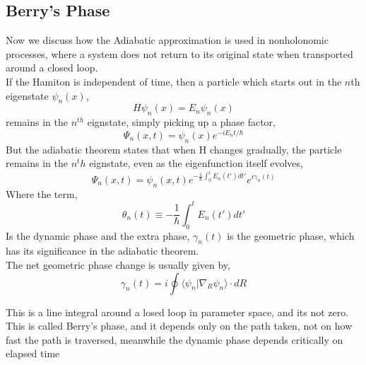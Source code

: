 \subsection{Berry's Phase}
Now we discuss how the Adiabatic approximation is used in nonholonomic processes, where a system does not return to its original state when transported around a closed loop.\\
If the Hamiton is independent of time, then a particle which starts out in the $n$th eigenstate $\psi_n(x)$,
\begin{equation}
	H\psi_n(x)=E_n\psi_n(x)
\end{equation}
remains in the $n^{th}$ eignstate, simply picking up a phase factor,
\begin{equation}
	\Psi_n(x,t)=\psi_n(x)e^{-iE_nt/\hbar}
\end{equation}
But the adiabatic theorem states that when H changes gradually, the particle remains in the $n^th$ eignstate, even as the eigenfunction itself evolves,
\begin{equation}
	\Psi_n(x,t)=\psi_n(x,t)e^{-\frac{1}{\hbar}\int_{0}^{t}E_n(t')dt'}e^{i\gamma_n(t)}
\end{equation}
Where the term,
\begin{equation}
	\theta_n(t)\equiv-\frac{1}{\hbar}\int_{0}^{t}E_n(t')dt'
\end{equation}
Is the dynamic phase and the extra phase, $\gamma_n(t)$ is the geometric phase, which has its significance in the adiabatic theorem.\\
The net geometric phase change is usually given by,
\begin{equation}
	\gamma_n(t)=i\oint \langle\psi_n|\nabla_R\psi_n\rangle \cdot dR
\end{equation}

This is a line integral around a losed loop in parameter space, and its not zero. This is called Berry's phase, and it depends only on the path taken, not on how fast the path is traversed, meanwhile the dynamic phase depends critically on elapsed time
